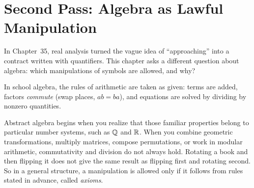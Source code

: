 \section{Second Pass: Algebra as Lawful Manipulation}
\chapterline

In Chapter~35, real analysis turned the vague idea of ``approaching'' into a contract written with quantifiers. This chapter asks a different question about algebra: which manipulations of symbols are allowed, and why?

In school algebra, the rules of arithmetic are taken as given: terms are added, factors \emph{commute} (swap places, $ab = ba$), and equations are solved by dividing by nonzero quantities.

Abstract algebra begins when you realize that those familiar properties belong to particular number systems, such as $\mathbb{Q}$ and $\mathbb{R}$. When you combine geometric transformations, multiply matrices, compose permutations, or work in modular arithmetic, commutativity and division do not always hold. Rotating a book and then flipping it does not give the same result as flipping first and rotating second. So in a general structure, a manipulation is allowed only if it follows from rules stated in advance, called \emph{axioms}.

